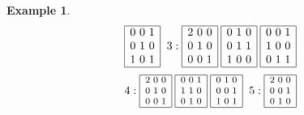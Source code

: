\documentclass[12pt]{article}
\theoremstyle{definition}
\newtheorem{Example}[Theorem]{Example}
\begin{document}
\begin{Example}
\[{\begin{array}{|c|}\hline
0\ 0\ 1\\ 0\ 1\ 0\\ 1\ 0\ 1\\ \hline
\end{array}
\hspace*{0mm}
\hspace*{2mm}3: 
\begin{array}{|c|}\hline
2\ 0\ 0\\ 0\ 1\ 0\\ 0\ 0\ 1\\ \hline
\end{array}
\hspace*{1mm}
\begin{array}{|c|}\hline
0\ 1\ 0\\ 0\ 1\ 1\\ 1\ 0\ 0\\ \hline
\end{array}
\hspace*{1mm}
\begin{array}{|c|}\hline
0\ 0\ 1\\ 1\ 0\ 0\\ 0\ 1\ 1\\ \hline
\end{array}
}\]
\[{\footnotesize
\hspace*{0mm}4: 
\begin{array}{|c|}\hline
2\ 0\ 0\\ 0\ 1\ 0\\ 0\ 0\ 1\\ \hline
\end{array}
\hspace*{1mm}
\begin{array}{|c|}\hline
0\ 0\ 1\\ 1\ 1\ 0\\ 0\ 1\ 0\\ \hline
\end{array}
\hspace*{1mm}
\begin{array}{|c|}\hline
0\ 1\ 0\\ 0\ 0\ 1\\ 1\ 0\ 1\\ \hline
\end{array}
\hspace*{0mm}
\hspace*{2mm}5: 
\begin{array}{|c|}\hline
2\ 0\ 0\\ 0\ 0\ 1\\ 0\ 1\ 0\\ \hline

\end{array}}\]
\end{Example}
\end{document}
